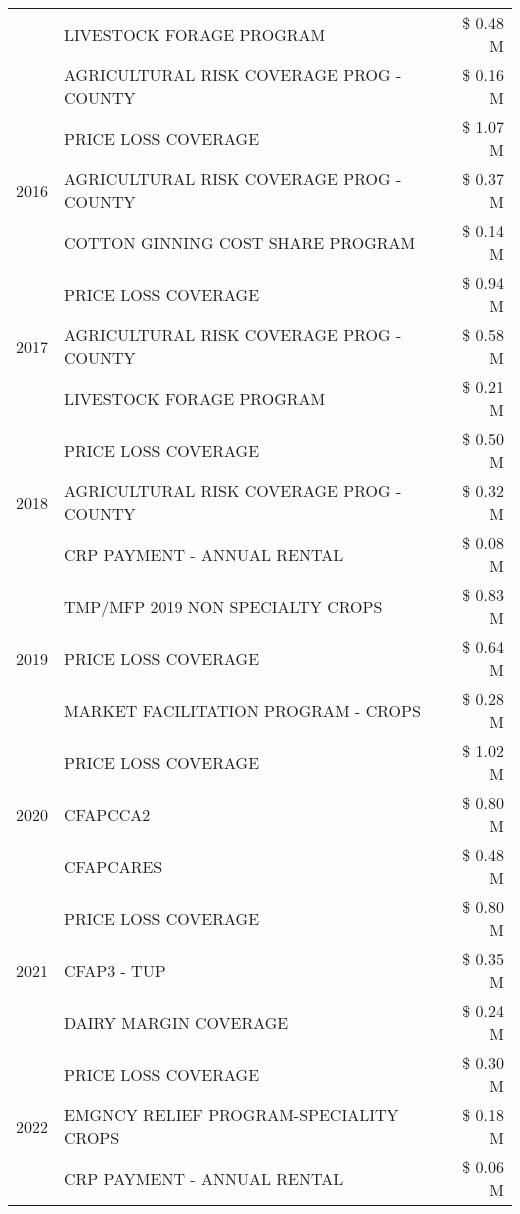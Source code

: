 \begin{tabular}{llr}
 & LIVESTOCK FORAGE PROGRAM & \$ 0.48 M \\
 & AGRICULTURAL RISK COVERAGE PROG - COUNTY & \$ 0.16 M \\
\cline{1-3}
\multirow[t]{3}{*}{2016} & PRICE LOSS COVERAGE & \$ 1.07 M \\
 & AGRICULTURAL RISK COVERAGE PROG - COUNTY & \$ 0.37 M \\
 & COTTON GINNING COST SHARE PROGRAM & \$ 0.14 M \\
\cline{1-3}
\multirow[t]{3}{*}{2017} & PRICE LOSS COVERAGE & \$ 0.94 M \\
 & AGRICULTURAL RISK COVERAGE PROG - COUNTY & \$ 0.58 M \\
 & LIVESTOCK FORAGE PROGRAM & \$ 0.21 M \\
\cline{1-3}
\multirow[t]{3}{*}{2018} & PRICE LOSS COVERAGE & \$ 0.50 M \\
 & AGRICULTURAL RISK COVERAGE PROG - COUNTY & \$ 0.32 M \\
 & CRP PAYMENT - ANNUAL RENTAL & \$ 0.08 M \\
\cline{1-3}
\multirow[t]{3}{*}{2019} & TMP/MFP 2019 NON SPECIALTY CROPS & \$ 0.83 M \\
 & PRICE LOSS COVERAGE & \$ 0.64 M \\
 & MARKET FACILITATION PROGRAM - CROPS & \$ 0.28 M \\
\cline{1-3}
\multirow[t]{3}{*}{2020} & PRICE LOSS COVERAGE & \$ 1.02 M \\
 & CFAPCCA2 & \$ 0.80 M \\
 & CFAPCARES & \$ 0.48 M \\
\cline{1-3}
\multirow[t]{3}{*}{2021} & PRICE LOSS COVERAGE & \$ 0.80 M \\
 & CFAP3 - TUP & \$ 0.35 M \\
 & DAIRY MARGIN COVERAGE & \$ 0.24 M \\
\cline{1-3}
\multirow[t]{3}{*}{2022} & PRICE LOSS COVERAGE & \$ 0.30 M \\
 & EMGNCY RELIEF PROGRAM-SPECIALITY CROPS & \$ 0.18 M \\
 & CRP PAYMENT - ANNUAL RENTAL & \$ 0.06 M \\
\cline{1-3}
\bottomrule
\end{tabular}
